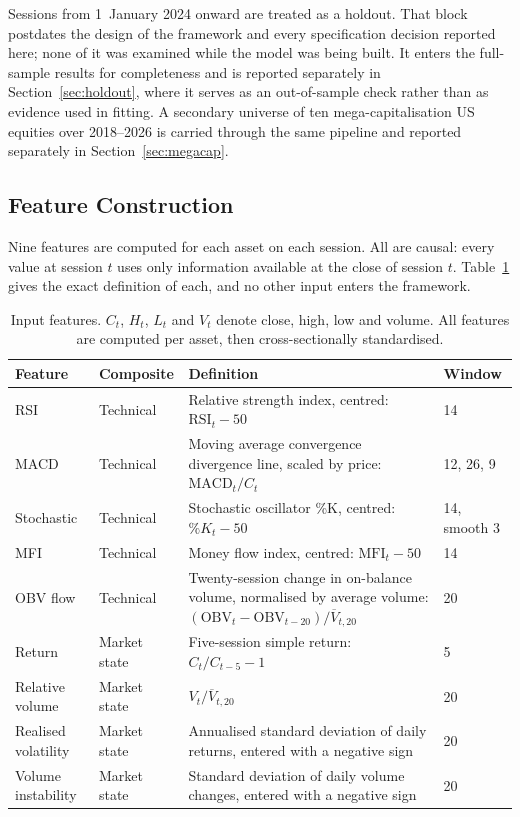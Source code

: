 \documentclass{singlecol-new}
\theoremstyle{TH}{
\newtheorem{lemma}{Lemma}
\newtheorem{theorem}[lemma]{Theorem}
\newtheorem{corrolary}[lemma]{Corrolary}
\newtheorem{conjecture}[lemma]{Conjecture}
\newtheorem{proposition}[lemma]{Proposition}
\newtheorem{claim}[lemma]{Claim}
\newtheorem{stheorem}[lemma]{Wrong Theorem}
\newtheorem{algorithm}{Algorithm}
}
\theoremstyle{THrm}{
\newtheorem{definition}{Definition}[section]
\newtheorem{question}{Question}[section]
\newtheorem{remark}{Remark}
\newtheorem{scheme}{Scheme}
}
\theoremstyle{THhit}{
\newtheorem{case}{Case}[section]
}
\begin{document}
Sessions from 1~January 2024 onward are treated as a holdout. That block postdates
the design of the framework and every specification decision reported here; none of
it was examined while the model was being built. It enters the full-sample results
for completeness and is reported separately in Section~\ref{sec:holdout}, where it
serves as an out-of-sample check rather than as evidence used in fitting. A secondary
universe of ten mega-capitalisation US equities over 2018--2026 is carried through the
same pipeline and reported separately in Section~\ref{sec:megacap}.

\subsection{Feature Construction}

Nine features are computed for each asset on each session. All are causal: every value
at session $t$ uses only information available at the close of session $t$. Table~\ref{tab:features}
gives the exact definition of each, and no other input enters the framework.

\begin{table}[!ht]
\centering
\caption{Input features. $C_t$, $H_t$, $L_t$ and $V_t$ denote close, high, low and
volume. All features are computed per asset, then cross-sectionally standardised.}
\label{tab:features}
\small
\begin{tabular}{p{2.0cm}p{1.8cm}p{5.2cm}p{1.5cm}}
\hline
\textbf{Feature} & \textbf{Composite} & \textbf{Definition} & \textbf{Window} \\
\hline
RSI & Technical & Relative strength index, centred: $\mathrm{RSI}_t - 50$ & 14 \\
\hline
MACD & Technical & Moving average convergence divergence line, scaled by price: $\mathrm{MACD}_t / C_t$ & 12, 26, 9 \\
\hline
Stochastic & Technical & Stochastic oscillator \%K, centred: $\%K_t - 50$ & 14, smooth 3 \\
\hline
MFI & Technical & Money flow index, centred: $\mathrm{MFI}_t - 50$ & 14 \\
\hline
OBV flow & Technical & Twenty-session change in on-balance volume, normalised by average volume: $(\mathrm{OBV}_t - \mathrm{OBV}_{t-20}) / \overline{V}_{t,20}$ & 20 \\
\hline
Return & Market state & Five-session simple return: $C_t / C_{t-5} - 1$ & 5 \\
\hline
Relative volume & Market state & $V_t / \overline{V}_{t,20}$ & 20 \\
\hline
Realised volatility & Market state & Annualised standard deviation of daily returns, entered with a negative sign & 20 \\
\hline
Volume instability & Market state & Standard deviation of daily volume changes, entered with a negative sign & 20 \\
\hline
\end{tabular}
\end{table}
\end{document}
